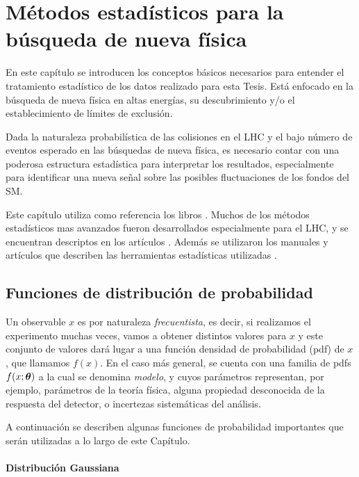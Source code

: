 \chapter{Métodos estadísticos para la búsqueda de nueva física}
\label{cap:estadistica}

En este capítulo se introducen los conceptos básicos necesarios para entender el
tratamiento estadístico de los datos realizado para esta Tesis. Está enfocado en
la búsqueda de nueva física en altas energías, su descubrimiento y/o el
establecimiento de límites de exclusión.

Dada la naturaleza probabilística de las colisiones en el LHC y el bajo número
de eventos esperado en las búsquedas de nueva física, es necesario contar con
una poderosa estructura estadística para interpretar los resultados, especialmente
para identificar una nueva señal sobre las posibles fluctuaciones de los fondos
del SM.

Este capítulo utiliza como referencia los libros \cite{Cowan,James}. Muchos de
los métodos estadísticos mas avanzados fueron desarrollados especialmente para
el LHC, y se encuentran descriptos en los artículos
\cite{AsymAprox,ReadCLs,medsigNote,Cranmer:2015nia}. Además se utilizaron los
manuales y artículos que describen las herramientas estadísticas utilizadas
\cite{Cranmer:1456844,HistFitter}.


\section{Funciones de distribución de probabilidad}

Un observable $x$ es por naturaleza \emph{frecuentista}, es decir, si realizamos
el experimento muchas veces, vamos a obtener distintos valores para $x$ y este
conjunto de valores dará lugar a una función densidad de probabilidad (pdf)
de $x$, que llamamos $f(x)$. En el caso más general, se cuenta con una familia
de pdfs $f(x;\bm{\theta})$ a la cual se denomina \emph{modelo}, y cuyos parámetros
representan, por ejemplo, parámetros de la teoría física, alguna
propiedad desconocida de la respuesta del detector, o incertezas sistemáticas
del análisis.

A continuación se describen algunas funciones de probabilidad importantes que
serán utilizadas a lo largo de este Capítulo.

\subsubsection{Distribución Gaussiana}


